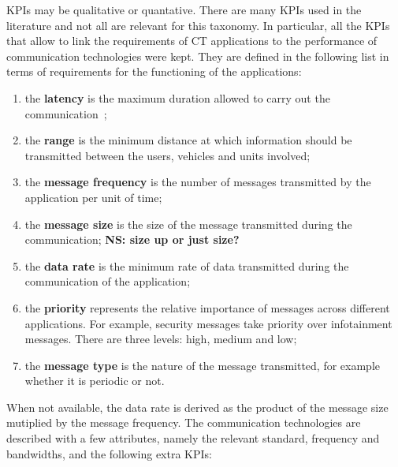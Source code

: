 
\acrshort{KPI}s may be qualitative or quantative. There are many \acrshort{KPI}s used in the literature and not all are relevant for this taxonomy. In particular, all the \acrshort{KPI}s that allow to link the requirements of \acrshort{CT} applications to the performance of communication technologies were kept. They are defined in the following list in terms of requirements for the functioning of the applications:

\begin{enumerate}
\item the {\bf latency} is the maximum duration allowed to carry out the communication~\cite{etsi_etsi_tr_102_638_intelligent_2009}; %
\item the {\bf range} is the minimum distance at which information should be transmitted between the users, vehicles and units involved;
\item the {\bf message frequency} is the number of messages transmitted by the application per unit of time;
\item the {\bf message size} is the size of the message transmitted during the communication; {\bf NS: size up or just size?}
\item the {\bf data rate} is the minimum rate of data transmitted during the communication of the application; %
\item the {\bf priority} represents the relative importance of messages across different applications. For example, security messages take priority over infotainment messages. There are three levels: high, medium and low; 
\item the {\bf message type} is the nature of the message transmitted, for example whether it is periodic or not. 
\end{enumerate}

When not available, the data rate is derived as the product of the message size mutiplied by the message frequency. The communication technologies are described with a few attributes, namely the relevant standard, frequency and bandwidths, and the following extra \acrshort{KPI}s:

